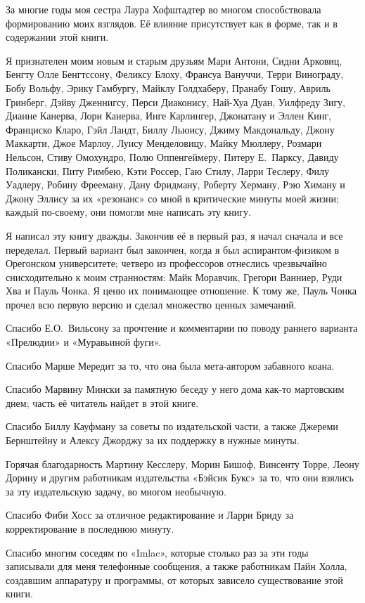 \documentclass[../main.tex]{subfiles}
\begin{document}
За многие годы моя сестра Лаура Хофштадтер во многом способствовала формированию моих взглядов. Её влияние присутствует как в форме, так и в содержании этой книги.

Я признателен моим новым и старым друзьям Мари Антони, Сидни Арковиц, Бенгту Олле Бенгтссону, Феликсу Блоху, Франсуа Вануччи, Терри Винограду, Бобу Вольфу, Эрику Гамбургу, Майклу Голдхаберу, Пранабу Гошу, Авриль Гринберг, Дэйву Дженнигсу, Перси Диаконису, Най-Хуа Дуан, Уилфреду Зигу, Дианне Канерва, Лори Канерва, Инге Карлингер, Джонатану и Эллен Кинг, Франциско Кларо, Гэйл Ландт, Биллу Льюису, Джиму Макдональду, Джону Маккарти, Джое Марлоу, Луису Менделовицу, Майку Мюллеру, Розмари Нельсон, Стиву Омохундро, Полю Оппенгеймеру, Питеру Е.~Парксу, Давиду Поликански, Питу Римбею, Кэти Россер, Гаю Стилу, Ларри Теслеру, Филу Уадлеру, Робину Фрееману, Дану Фридману, Роберту Херману, Рэю Химану и Джону Эллису за их «резонанс» со мной в критические минуты моей жизни; каждый по-своему, они помогли мне написать эту книгу.

Я написал эту книгу дважды. Закончив её в первый раз, я начал сначала и все переделал. Первый вариант был закончен, когда я был аспирантом-физиком в Орегонском университете; четверо из профессоров отнеслись чрезвычайно снисходительно к моим странностям: Майк Моравчик, Грегори Ванниер, Руди Хва и Пауль Чонка. Я ценю их понимающее отношение. К тому же, Пауль Чонка прочел всю первую версию и сделал множество ценных замечаний.

Спасибо Е.О.~Вильсону за прочтение и комментарии по поводу раннего варианта «Прелюдии» и «Муравьиной фуги».

Спасибо Марше Мередит за то, что она была мета-автором забавного коана.

Спасибо Марвину Мински за памятную беседу у него дома как-то мартовским днем; часть её читатель найдет в этой книге.

Спасибо Биллу Кауфману за советы по издательской части, а также Джереми Бернштейну и Алексу Джорджу за их поддержку в нужные минуты.

Горячая благодарность Мартину Кесслеру, Морин Бишоф, Винсенту Торре, Леону Дорину и другим работникам издательства «Бэйсик Букс» за то, что они взялись за эту издательскую задачу, во многом необычную.

Спасибо Фиби Хосс за отличное редактирование и Ларри Бриду за корректирование в последнюю минуту.

Спасибо многим соседям по «Imlac», которые столько раз за эти годы записывали для меня телефонные сообщения, а также работникам Пайн Холла, создавшим аппаратуру и программы, от которых зависело существование этой книги.
\end{document}
